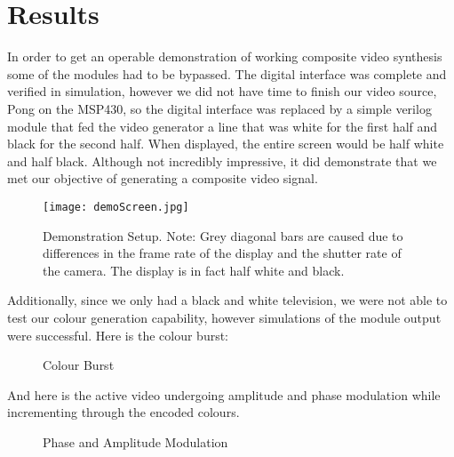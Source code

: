 \section{Results}

In order to get an operable demonstration of working composite video synthesis
some of the modules had to be bypassed. The digital interface was complete and
verified in simulation, however we did not have time to finish our video source,
Pong on the MSP430, so the digital interface was replaced by a simple verilog
module that fed the video generator a line that was white for the first half and
black for the second half. When displayed, the entire screen would be half white
and half black. Although not incredibly impressive, it did demonstrate that we
met our objective of generating a composite video signal.

\begin{figure} [H]
    \centering
    \texttt{[image: demoScreen.jpg]}
    \caption{Demonstration Setup. Note: Grey diagonal bars are caused due to
    differences in the frame rate of the display and the shutter rate of the
    camera. The display is in fact half white and black.}
\end{figure}

Additionally, since we only had a black and white television, we were not able
to test our colour generation capability, however simulations of the module
output were successful. Here is the colour burst:

\begin{figure}[H]
    \centering
    \caption{Colour Burst}
\end{figure}

And here is the active video undergoing amplitude and phase modulation while
incrementing through the encoded colours.

\begin{figure}[H]
    \centering
    \caption{Phase and Amplitude Modulation}
\end{figure}

